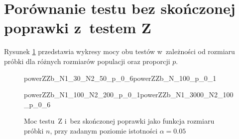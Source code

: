 \section{Porównanie testu bez skończonej poprawki z~testem Z}

Rysunek \ref{powerZZb_n} przedstawia wykresy mocy obu testów w~zależności od rozmiaru próbki dla różnych rozmiarów populacji oraz proporcji $p$.

\begin{figure}[!h]
	\begin{subdiagrams}{powerZZb_N1_30_N2_50_p_0_6}{powerZZb_N_100_p_0_1}
	\end{subdiagrams}
	
	\begin{subdiagrams}{powerZZb_N1_100_N2_200_p_0_1}{powerZZb_N1_3000_N2_100_p_0_6}
	\end{subdiagrams}
	
	\caption{Moc testu~Z i~bez skończonej poprawki jako funkcja rozmiaru próbki $n$, przy zadanym poziomie istotności $\alpha=0.05$}
	\label{powerZZb_n}
\end{figure}